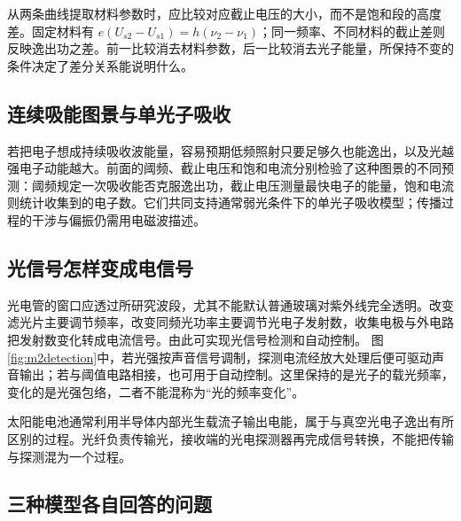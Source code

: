 从两条曲线提取材料参数时，应比较对应截止电压的大小，而不是饱和段的高度差。固定材料有 $e(U_{s2}-U_{s1})=h(\nu_2-\nu_1)$；同一频率、不同材料的截止差则反映逸出功之差。前一比较消去材料参数，后一比较消去光子能量，所保持不变的条件决定了差分关系能说明什么。

\subsection{连续吸能图景与单光子吸收}

若把电子想成持续吸收波能量，容易预期低频照射只要足够久也能逸出，以及光越强电子动能越大。前面的阈频、截止电压和饱和电流分别检验了这种图景的不同预测：阈频规定一次吸收能否克服逸出功，截止电压测量最快电子的能量，饱和电流则统计收集到的电子数。它们共同支持通常弱光条件下的单光子吸收模型；传播过程的干涉与偏振仍需用电磁波描述。

\subsection{光信号怎样变成电信号}

光电管的窗口应透过所研究波段，尤其不能默认普通玻璃对紫外线完全透明。改变滤光片主要调节频率，改变同频光功率主要调节光电子发射数，收集电极与外电路把发射数变化转成电流信号。由此可实现光信号检测和自动控制。
图\ref{fig:m2detection}中，若光强按声音信号调制，探测电流经放大处理后便可驱动声音输出；若与阈值电路相接，也可用于自动控制。这里保持的是光子的载光频率，变化的是光强包络，二者不能混称为“光的频率变化”。

太阳能电池通常利用半导体内部光生载流子输出电能，属于与真空光电子逸出有所区别的过程。光纤负责传输光，接收端的光电探测器再完成信号转换，不能把传输与探测混为一个过程。

\subsection{三种模型各自回答的问题}

